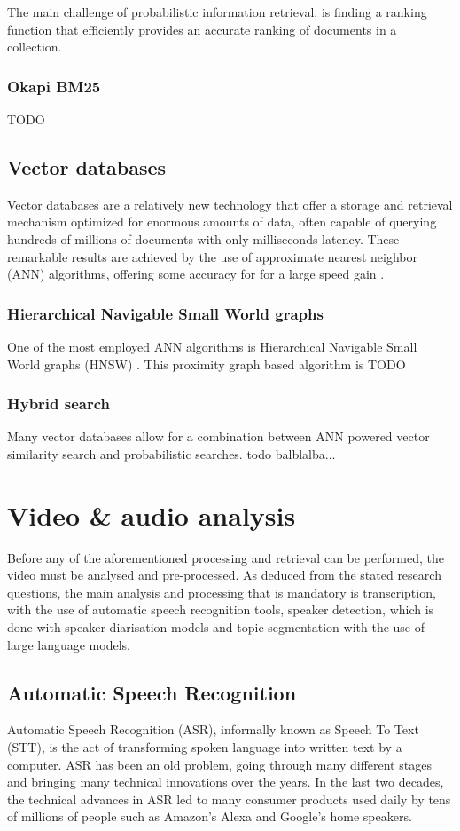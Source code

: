 \documentclass[twoside]{uva-inf-bachelor-thesis}
\begin{document}
The main challenge of probabilistic information retrieval, is finding a ranking function that efficiently provides an accurate ranking of documents in a collection. 

\subsubsection{Okapi BM25}
TODO


\subsection{Vector databases}
Vector databases are a relatively new technology that offer a storage and retrieval mechanism optimized for enormous amounts of data, often capable of querying hundreds of millions of documents with only milliseconds latency. 
These remarkable results are achieved by the use of approximate nearest neighbor (ANN) algorithms, offering some accuracy for for a large speed gain \cite{han2023comprehensive}. 

\subsubsection{Hierarchical Navigable Small World graphs}
One of the most employed ANN algorithms is Hierarchical Navigable Small World graphs (HNSW) \cite{malkov2018efficient}. This proximity graph based algorithm is TODO

\subsubsection{Hybrid search}
Many vector databases allow for a combination between ANN powered vector similarity search and probabilistic searches. todo balblalba...


\section{Video \& audio analysis}
Before any of the aforementioned processing and retrieval can be performed, the video must be analysed and pre-processed. As deduced from the stated research questions, the main analysis and processing that is mandatory is transcription, with the use of automatic speech recognition tools, speaker detection, which is done with speaker diarisation models and topic segmentation with the use of large language models.

\subsection{Automatic Speech Recognition}
Automatic Speech Recognition (ASR), informally known as Speech To Text (STT), is the act of transforming spoken language into written text by a computer. ASR has been an old problem, going through many different stages and bringing many technical innovations over the years. 
In the last two decades, the technical advances in ASR led to many consumer products used daily by tens of millions of people such as Amazon's Alexa and Google's home speakers.
\end{document}
